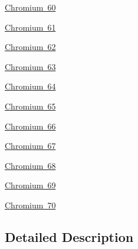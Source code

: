 \begin{DoxyCompactItemize}
\item 
\mbox{\hyperlink{group___isotope_const-_chromium-_cr60}{Chromium 60}}
\item 
\mbox{\hyperlink{group___isotope_const-_chromium-_cr61}{Chromium 61}}
\item 
\mbox{\hyperlink{group___isotope_const-_chromium-_cr62}{Chromium 62}}
\item 
\mbox{\hyperlink{group___isotope_const-_chromium-_cr63}{Chromium 63}}
\item 
\mbox{\hyperlink{group___isotope_const-_chromium-_cr64}{Chromium 64}}
\item 
\mbox{\hyperlink{group___isotope_const-_chromium-_cr65}{Chromium 65}}
\item 
\mbox{\hyperlink{group___isotope_const-_chromium-_cr66}{Chromium 66}}
\item 
\mbox{\hyperlink{group___isotope_const-_chromium-_cr67}{Chromium 67}}
\item 
\mbox{\hyperlink{group___isotope_const-_chromium-_cr68}{Chromium 68}}
\item 
\mbox{\hyperlink{group___isotope_const-_chromium-_cr69}{Chromium 69}}
\item 
\mbox{\hyperlink{group___isotope_const-_chromium-_cr70}{Chromium 70}}
\end{DoxyCompactItemize}


\subsection{Detailed Description}
